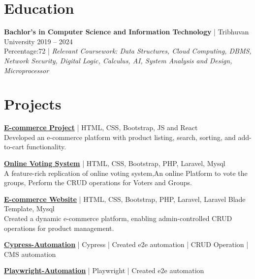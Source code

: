 \documentclass[a4paper,10pt]{article}
\begin{document}
\section*{Education}
\textbf{Bachlor's in Computer Science and Information Technology} | Tribhuvan University \hfill 2019 -- 2024 \\
Percentage:72 | \textit{Relevant Coursework: Data Structures, Cloud Computing, DBMS, Network Security, Digital Logic, Calculus, AI, System Analysis and Design, Microprocessor}

\section*{Projects}
\textbf{\href{https://bhimassignment.netlify.app/}{E-commerce Project}} | HTML, CSS, Bootstrap, JS and React \\  
Developed an e-commerce platform with product listing, search, sorting, and add-to-cart functionality.

\noindent\textbf{\href{https://github.com/bhimpd/Online-Voting-System}{Online Voting System}} | HTML, CSS, Bootstrap, PHP, Laravel, Mysql \\  
A feature-rich replication of online voting system,An online Platform to vote the groups, Perform the CRUD operations for Voters and Groups.

\noindent\textbf{\href{https://github.com/bhimpd/laravel_2ndecommerce}{E-commerce Website}} | HTML, CSS, Bootstrap, PHP, Laravel, Laravel Blade Template,  Mysql \\  
Created a dynamic e-commerce platform, enabling admin-controlled CRUD operations for product management.

\noindent\textbf{\href{https://github.com/bhimpd/toolfix_automation}{Cypress-Automation}} | Cypress |  Created e2e automation | CRUD Operation | CMS automation

\noindent\textbf{\href{https://github.com/bhimpd/playwright_automation}{Playwright-Automation}} | Playwright |  Created e2e automation

\end{document}
